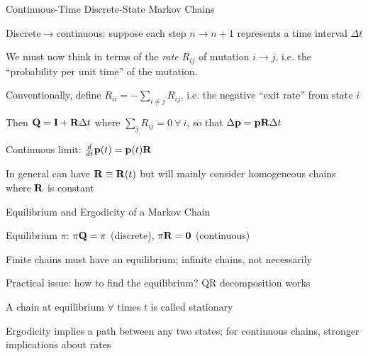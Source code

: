 \documentclass{beamer}
\begin{document}
\begin{frame}{Continuous-Time Discrete-State Markov Chains}

\itemb
 \item Discrete$\to$continuous: suppose each step $n\to n+1$ represents a time interval $\Delta t$
%
  \itemb
  \item We must now think in terms of the {\em rate} $R_{ij}$ of mutation $i \to j$, i.e. the ``probability per unit time'' of the mutation.
%
  \item Conventionally, define $R_{ii} = -\sum_{i \neq j} R_{ij}$, i.e. the negative ``exit rate'' from state $i$
\pause
  \item Then ${\bf Q} = {\bf I} + {\bf R} \Delta t$ where $\sum_j R_{ij} = 0\ \forall\ i$, so that $\Delta {\bf p} = {\bf pR} \Delta t$
\pause
  \item Continuous limit: $\frac{d}{dt} {\bf p}(t) = {\bf p}(t) {\bf R}$
\pause
  \iteme
 \item In general can have ${\bf R} \equiv {\bf R}(t)$ but will mainly consider \alert{homogeneous} chains where ${\bf R}$ is constant
\iteme

\end{frame}

\begin{frame}{Equilibrium and Ergodicity of a Markov Chain}

\itemb
\item \alert{Equilibrium} $\pi$: $\pi{\bf Q}=\pi$ (discrete), $\pi{\bf R}={\bf 0}$ (continuous)
%
 \itemb
 \item Finite chains must have an equilibrium; infinite chains, not necessarily
%
 \item Practical issue: how to find the equilibrium? QR decomposition works
%
 \item A chain at equilibrium $\forall$ times $t$ is called \alert{stationary}
 \iteme
%
\item \alert{Ergodicity} implies a path between any two states; for continuous chains, stronger implications about rates
\iteme

\end{frame}
\end{document}
